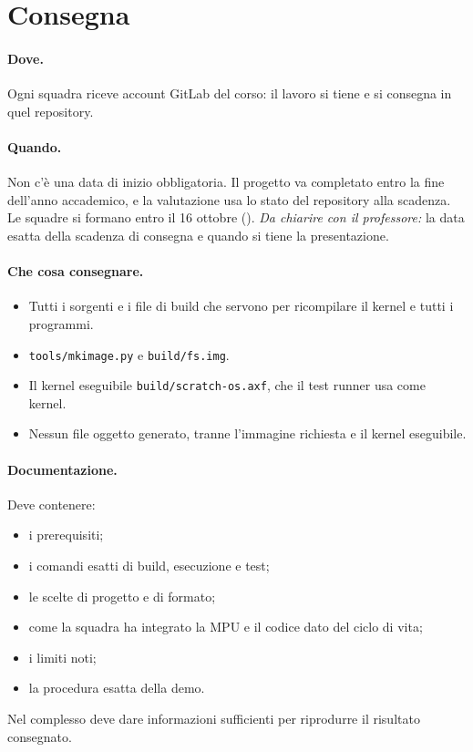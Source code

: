 \section{Consegna}

\paragraph{Dove.} Ogni squadra riceve account GitLab del corso: il lavoro si tiene e si consegna in quel repository.

\paragraph{Quando.} Non c'è una data di inizio obbligatoria. Il progetto va completato entro la fine dell'anno accademico, e la valutazione usa lo stato del repository alla scadenza. Le squadre si formano entro il 16 ottobre (). \emph{Da chiarire con il professore:} la data esatta della scadenza di consegna e quando si tiene la presentazione.

\paragraph{Che cosa consegnare.}
\begin{itemize}\sloppy
\item Tutti i sorgenti e i file di build che servono per ricompilare il kernel e tutti i programmi.
\item \texttt{tools/mkimage.py} e \texttt{build/fs.img}.
\item Il kernel eseguibile \texttt{build/scratch-os.axf}, che il test runner usa come kernel.
\item Nessun file oggetto generato, tranne l'immagine richiesta e il kernel eseguibile.
\end{itemize}

\paragraph{Documentazione.} Deve contenere:
\begin{itemize}
\item i prerequisiti;
\item i comandi esatti di build, esecuzione e test;
\item le scelte di progetto e di formato;
\item come la squadra ha integrato la MPU e il codice dato del ciclo di vita;
\item i limiti noti;
\item la procedura esatta della demo.
\end{itemize}
Nel complesso deve dare informazioni sufficienti per riprodurre il risultato consegnato.

